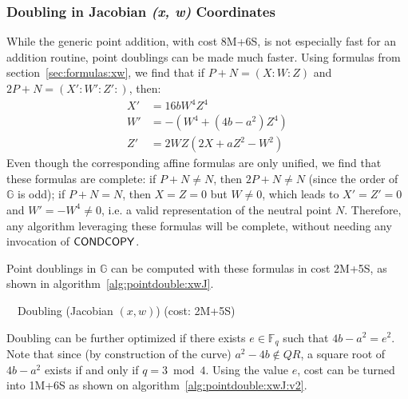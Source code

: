 \documentclass{llncs}
\newcommand{\QR}{QR}
\newcommand{\bF}{\mathbb{F}}
\newcommand{\bG}{\mathbb{G}}
\begin{document}
\subsubsection{Doubling in Jacobian \emph{(x, w)} Coordinates}\label{sec:algorithms:xwJ:dbl}

While the generic point addition, with cost 8M+6S, is not especially
fast for an addition routine, point doublings can be made much faster.
Using formulas from section~\ref{sec:formulas:xw}, we find that if
$P+N = (X{:}W{:}Z)$ and $2P+N = (X'{:}W'{:}Z'{:})$, then:
\begin{align*}
    X' &= 16bW^4 Z^4 \\
    W' &= -(W^4 + (4b-a^2)Z^4) \\
    Z' &= 2WZ(2X + aZ^2 - W^2)
\end{align*}
Even though the corresponding affine formulas are only unified, we find
that these formulas are complete: if $P+N \neq N$, then $2P+N \neq N$
(since the order of $\bG$ is odd); if $P+N = N$, then $X = Z = 0$ but
$W \neq 0$, which leads to $X' = Z' = 0$ and $W' = -W^4 \neq 0$, i.e. a
valid representation of the neutral point $N$. Therefore, any algorithm
leveraging these formulas will be complete, without needing any
invocation of $\text{\textsf{CONDCOPY}}$.

Point doublings in $\bG$ can be computed with these formulas in cost
2M+5S, as shown in algorithm~\ref{alg:pointdouble:xwJ}.

\begin{algorithm}[H]
    \caption{\ \ Doubling (Jacobian $(x,w)$) (cost: 2M+5S)}\label{alg:pointdouble:xwJ}
    \begin{algorithmic}[1]
    \end{algorithmic}
\end{algorithm}

Doubling can be further optimized if there exists $e \in \bF_q$ such
that $4b - a^2 = e^2$. Note that since (by construction of the curve)
$a^2 - 4b \notin \QR$, a square root of $4b - a^2$ exists if and only if
$q = 3\bmod 4$. Using the value $e$, cost can be turned into 1M+6S as
shown on algorithm~\ref{alg:pointdouble:xwJ:v2}.
\end{document}
